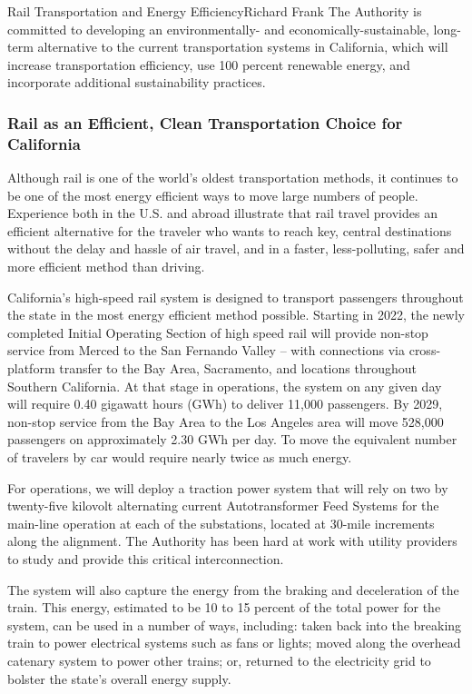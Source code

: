 \documentclass[10pt]{papertex}
\begin{document}
\begin{news}{2}{Rail Transportation and Energy Efficiency}{Richard Frank}{}{}
The Authority is committed to developing an environmentally- and 
economically-sustainable, long-term alternative to the current transportation 
systems in California, which will increase transportation efficiency, use 100 
percent renewable energy, and incorporate additional sustainability practices.

\subsubsection*{Rail as an Efficient, Clean Transportation Choice for
    California}

Although rail is one of the world’s oldest transportation methods, it continues 
to be one of the most energy efficient ways to move large numbers of people. 
Experience both in the U.S. and abroad illustrate that rail travel provides an 
efficient alternative for the traveler who wants to reach key, central 
destinations without the delay and hassle of air travel, and in a faster, 
less-polluting, safer and more efficient method than driving.

California’s high-speed rail system is designed to transport passengers 
throughout the state in the most energy efficient method possible. Starting in 
2022, the newly completed Initial Operating Section of high speed rail will 
provide non-stop service from Merced to the San Fernando Valley – with 
connections via cross-platform transfer to the Bay Area, Sacramento, and 
locations throughout Southern California. At that stage in operations, the 
system on any given day will require 0.40 gigawatt hours (GWh) to deliver 
11,000 passengers.  By 2029, non-stop service from the Bay Area to the Los 
Angeles area will move 528,000 passengers on approximately 2.30 GWh per day. 
To move the equivalent number of travelers by car would require nearly twice 
as much energy.

For operations, we will deploy a traction power system that will rely on two 
by twenty-five kilovolt alternating current Autotransformer Feed Systems for 
the main-line operation at each of the substations, located at 30-mile 
increments along the alignment.  The Authority has been hard at work with 
utility providers to study and provide this critical interconnection.

The system will also capture the energy from the braking and deceleration of 
the train. This energy, estimated to be 10 to 15 percent of the total power 
for the system, can be used in a number of ways, including: taken back into 
the breaking train to power electrical systems such as fans or lights; moved 
along the overhead catenary system to power other trains; or, returned to the 
electricity grid to bolster the state’s overall energy supply.


\end{news}
\end{document}
